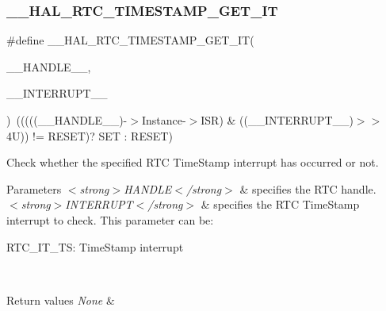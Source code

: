 \subsubsection{\texorpdfstring{\+\_\+\+\_\+\+H\+A\+L\+\_\+\+R\+T\+C\+\_\+\+T\+I\+M\+E\+S\+T\+A\+M\+P\+\_\+\+G\+E\+T\+\_\+\+IT}{\_\_HAL\_RTC\_TIMESTAMP\_GET\_IT}}
{\footnotesize\ttfamily \#define \+\_\+\+\_\+\+H\+A\+L\+\_\+\+R\+T\+C\+\_\+\+T\+I\+M\+E\+S\+T\+A\+M\+P\+\_\+\+G\+E\+T\+\_\+\+IT(\begin{DoxyParamCaption}\item[{}]{\+\_\+\+\_\+\+H\+A\+N\+D\+L\+E\+\_\+\+\_\+,  }\item[{}]{\+\_\+\+\_\+\+I\+N\+T\+E\+R\+R\+U\+P\+T\+\_\+\+\_\+ }\end{DoxyParamCaption})~(((((\+\_\+\+\_\+\+H\+A\+N\+D\+L\+E\+\_\+\+\_\+)-\/$>$Instance-\/$>$I\+SR) \& ((\+\_\+\+\_\+\+I\+N\+T\+E\+R\+R\+U\+P\+T\+\_\+\+\_\+)$>$$>$ 4\+U)) != R\+E\+S\+E\+T)? S\+E\+T \+: R\+E\+S\+E\+T)}



Check whether the specified R\+TC Time\+Stamp interrupt has occurred or not. 


\begin{DoxyParams}{Parameters}
{\em $<$strong$>$\+H\+A\+N\+D\+L\+E$<$/strong$>$} & specifies the R\+TC handle. \\
\hline
{\em $<$strong$>$\+I\+N\+T\+E\+R\+R\+U\+P\+T$<$/strong$>$} & specifies the R\+TC Time\+Stamp interrupt to check. This parameter can be\+: \begin{DoxyItemize}
\item R\+T\+C\+\_\+\+I\+T\+\_\+\+TS\+: Time\+Stamp interrupt \end{DoxyItemize}
\\
\hline
\end{DoxyParams}

\begin{DoxyRetVals}{Return values}
{\em None} & \\
\hline
\end{DoxyRetVals}
\mbox{\label{group___r_t_c_ex___timestamp_ga54100a14a01e1ebe8af226385d12ee57}} 
